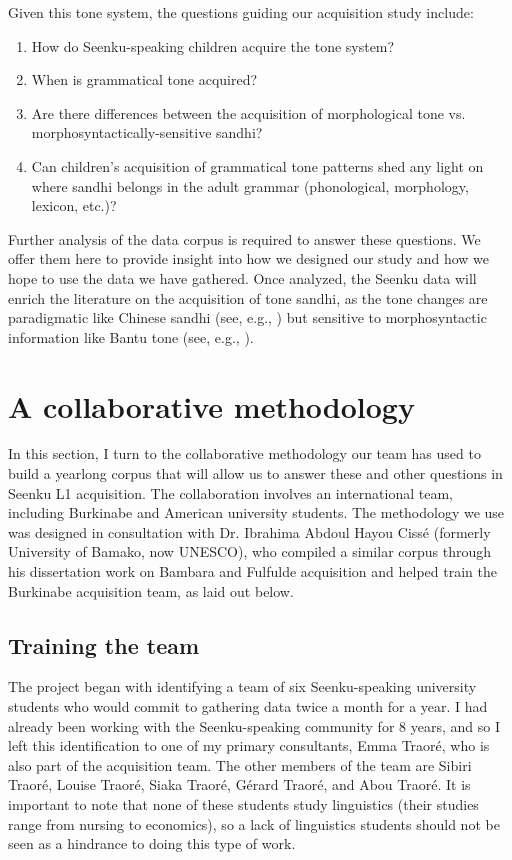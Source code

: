 \documentclass[output=paper,colorlinks,citecolor=brown,
]{langscibook}
\begin{document}
Given this tone system, the questions guiding our acquisition study include: 

\begin{enumerate}
    \item How do Seenku-speaking children acquire the tone system? 
    \item When is grammatical tone acquired? 
    \item Are there differences between the acquisition of morphological tone vs. morphosyntactically-sensitive sandhi? 
    \item Can children's acquisition of grammatical tone patterns shed any light on where sandhi belongs in the adult grammar (phonological, morphology, lexicon, etc.)? 
\end{enumerate}

Further analysis of the data corpus is required to answer these questions. We offer them here to provide insight into how we designed our study and how we hope to use the data we have gathered. Once analyzed, the Seenku data will enrich the literature on the acquisition of tone sandhi, as the tone changes are paradigmatic like Chinese sandhi (see, e.g., \citealt{Tangetal19}) but sensitive to morphosyntactic information like Bantu tone (see, e.g., \citealt{Demuth93}). 


\section{A collaborative methodology}\label{sec:mcpherson:methodology}

In this section, I turn to the collaborative methodology our team has used to build a yearlong corpus that will allow us to answer these and other questions in Seenku L1 acquisition. The collaboration involves an international team, including Burkinabe and American university students. The methodology we use was designed in consultation with Dr. Ibrahima Abdoul Hayou Cissé (formerly University of Bamako, now UNESCO), who compiled a similar corpus through his dissertation work on Bambara and Fulfulde acquisition \citep{Cisse14} and helped train the Burkinabe acquisition team, as laid out below. 

\subsection{Training the team}\label{sec:mcpherson:training}

The project began with identifying a team of six Seenku-speaking university students who would commit to gathering data twice a month for a year. I had already been working with the Seenku-speaking community for 8 years, and so I left this identification to one of my primary consultants, Emma Traoré, who is also part of the acquisition team. The other members of the team are Sibiri Traoré, Louise Traoré, Siaka Traoré, Gérard Traoré, and Abou Traoré. It is important to note that none of these students study linguistics (their studies range from nursing to economics), so a lack of linguistics students should not be seen as a hindrance to doing this type of work.  
\end{document}

